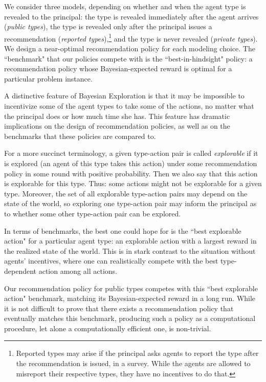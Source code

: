 We consider three models, depending on whether and when the agent type is revealed to the principal: the type is revealed immediately after the agent arrives (\emph{public types}), the type is revealed only after the principal issues a recommendation (\emph{reported types}),\footnote{Reported types may arise if
the principal asks agents to report the type after the recommendation is issued, \eg in a survey. While the agents are allowed to misreport their respective types, they have no incentives to do that.}
and the type is never revealed (\emph{private types}).
%
We design a near-optimal recommendation policy for each modeling choice. The ``benchmark" that our policies compete with is the ``best-in-hindsight"
policy: a recommendation policy whose Bayesian-expected reward is optimal for a particular problem instance.


A distinctive feature of Bayesian Exploration is that it may be impossible to incentivize some of the agent types to take some of the actions, no matter what the principal does or how much time she has. This feature has dramatic implications on the design of recommendation policies, as well as on the benchmarks that these policies are compared to.

For a more succinct terminology, a given type-action pair is called \emph{explorable} if it is explored (\ie an agent of this type takes this action) under some recommendation policy in some round with positive probability. Then we also say that this action is explorable for this type. Thus: some actions might not be explorable for a given type. Moreover, the set of all explorable type-action pairs may depend on the state of the world, so  exploring one type-action pair may inform the principal as to whether some other type-action pair can be explored.

In terms of benchmarks, the best one could hope for is the ``best explorable action" for a particular agent type: an explorable action with a largest reward in the realized state of the world. This is in stark contrast to the situation without agents' incentives, where one can realistically compete with the best type-dependent action among all actions.

Our recommendation policy for public types competes with this ``best explorable action" benchmark, matching its Bayesian-expected reward in a long run. While it is not difficult to prove that there exists a recommendation policy that eventually matches this benchmark, producing such a policy as a computational procedure, let alone a computationally efficient one, is non-trivial.

